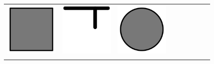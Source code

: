 \documentclass[doc]{apa6}
\newcommand{\stimulusscale}{.1}
\begin{document}
\begin{figure}[p]
\begin{center}
\begin{tabular}{c|cccccccc}
\includegraphics[scale=\stimulusscale]{./set4stim55.png} &
\includegraphics[scale=\stimulusscale]{./set5stim55.png} &
\includegraphics[scale=\stimulusscale]{./set6stim55.png} \\[6pt]
 \raisebox{.75cm}{75}  &

\end{tabular}
\end{center}
\end{figure}
\end{document}
